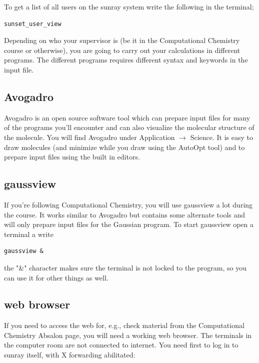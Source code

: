 \documentclass{article}
\begin{document}
To get a list of all users on the sunray system write the following in the terminal;

\begin{lstlisting}
sunset_user_view
\end{lstlisting}


Depending on who your supervisor is (be it in the Computational Chemistry course or otherwise), you are going to carry out your calculations in different programs.
The different programs requires different syntax and keywords in the input file.\\

\subsection*{Avogadro}

Avogadro is an open source software tool which can prepare input files for many of the programs you'll encounter and can also visualize the molecular structure of the molecule.
You will find Avogadro under Application $\rightarrow$ Science.
It is easy to draw molecules (and minimize while you draw using the AutoOpt tool) and to prepare input files using the built in editors.

\subsection*{gaussview}

If you're following Computational Chemistry, you will use gaussview a lot during the course.
It works similar to Avogadro but contains some alternate tools and will only prepare input files for the Gaussian program.
To start gaussview open a terminal a write
\begin{lstlisting}
gaussview &
\end{lstlisting}

the "\&" character makes sure the terminal is not locked to the program, so you can use it for other things as well.


\subsection*{web browser}

If you need to access the web for, e.g., check material from the Computational Chemistry Absalon page, you will need a working web browser.
The terminals in the computer room are not connected to internet. You need first to log in to sunray itself, with X forwarding abilitated:
\end{document}
